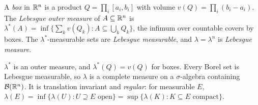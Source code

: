 \begin{definition}\label{measure-theory:definition-lebesgue}
A \emph{box} in $\mathbb{R}^n$ is a product $Q = \prod_i[a_i, b_i]$ with volume $v(Q) = \prod_i(b_i - a_i)$. The \emph{Lebesgue outer measure} of $A \subseteq \mathbb{R}^n$ is
$\lambda^*(A) = \inf\{\sum_kv(Q_k) : A \subseteq \bigcup_kQ_k\}$, the infimum over countable covers by boxes. The $\lambda^*$-measurable sets are \emph{Lebesgue measurable}, and $\lambda = \lambda^n$ is
\emph{Lebesgue measure}.
\end{definition}

\begin{theorem}\label{measure-theory:theorem-lebesgue-measure}
$\lambda^*$ is an outer measure, and $\lambda^*(Q) = v(Q)$ for boxes. Every Borel set is Lebesgue measurable, so $\lambda$ is a complete measure on a $\sigma$-algebra containing $\mathcal{B}(\mathbb{R}^n)$. It is
translation invariant and \emph{regular}: for measurable $E$, $\lambda(E) = \inf\{\lambda(U) : U \supseteq E \text{ open}\} = \sup\{\lambda(K) : K \subseteq E \text{ compact}\}$.
\end{theorem}


